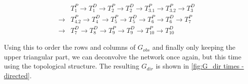 \documentclass[../Thesis.tex]{subfiles}
\begin{document}
\begin{equation}\label{eq:times topological order}
    \begin{split}
         & T^P_{1} \longrightarrow
        T^D_{1} \longrightarrow
        T^P_{2} \longrightarrow
        T^D_{2} \longrightarrow
        T^P_{3.1} \longrightarrow
        T^P_{3.2} \longrightarrow
        T^D_{3}                      \\
        \longrightarrow
         & T^P_{4.2} \longrightarrow
        T^D_{4} \longrightarrow
        T^P_{5} \longrightarrow
        T^D_{5} \longrightarrow
        T^P_{6} \longrightarrow
        T^D_{6} \longrightarrow
        T^P_{7}                      \\
        \longrightarrow
         & T^D_{7} \longrightarrow
        T^D_{8} \longrightarrow
        T^P_{9} \longrightarrow
        T^D_{9} \longrightarrow
        T^P_{10} \longrightarrow
        T^D_{10}
    \end{split}
\end{equation}

Using this to order the rows and columns of $G_{obs}$ and finally only keeping the upper triangular part, we can deconvolve the network once again, but this time using the topological structure. The resulting $G_{dir}$ is shown in \autoref{fig:G_dir times - directed}.
\end{document}

